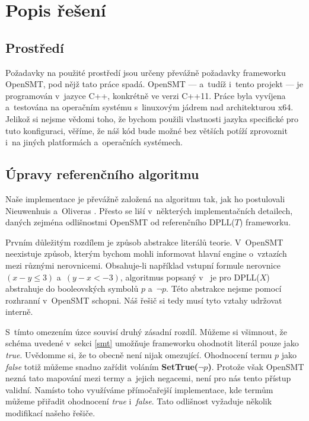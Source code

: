 \chapter{Popis řešení}


\section{Prostředí}

Požadavky na použité prostředí jsou určeny převážně požadavky frameworku OpenSMT, pod nějž tato práce spadá. OpenSMT --- a~tudíž i~tento projekt --- je programován v~jazyce C++, konkrétně ve verzi C++11. Práce byla vyvíjena a~testována na operačním systému s~linuxovým jádrem nad architekturou x64. Jelikož si nejsme vědomi toho, že bychom použili vlastnosti jazyka specifické pro tuto konfiguraci, věříme, že náš kód bude možné bez větších potíží zprovoznit i~na jiných platformách a~operačních systémech.

\section{Úpravy referenčního algoritmu}\label{upravy}

Naše implementace je převážně založená na algoritmu tak, jak ho postulovali Nieuwenhuis a~Oliveras \cite{Nieuwenhuis05}. Přesto se liší v~některých implementačních detailech, daných zejména odlišnostmi OpenSMT od referenčního DPLL($T$) frameworku. %

Prvním důležitým rozdílem je způsob abstrakce literálů teorie. V~OpenSMT neexistuje způsob, kterým bychom mohli informovat hlavní engine o~vztazích mezi různými nerovnicemi. Obsahuje-li například vstupní formule nerovnice $(x-y\leq 3)$ a~$(y-x<-3)$, algoritmus popsaný v~\cite{Nieuwenhuis05} je pro DPLL($X$) abstrahuje do booleovských symbolů $p$ a~$\neg p$. Této abstrakce nejsme pomocí rozhranní v~OpenSMT schopni. Náš řešič si tedy musí tyto vztahy udržovat interně. 

S~tímto omezením úzce souvisí druhý zásadní rozdíl. Můžeme si všimnout, že schéma uvedené v~sekci \ref{smt} umožňuje frameworku ohodnotit literál pouze jako \emph{true}. Uvědomme si, že to obecně není nijak omezující. Ohodnocení termu $p$ jako \emph{false} totiž můžeme snadno zařídit voláním \textbf{SetTrue($\neg p$)}. Protože však OpenSMT nezná tato mapování mezi termy a~jejich negacemi, není pro nás tento přístup validní. Namísto toho využíváme přímočařejší implementace, kde termům můžeme přiřadit ohodnocení \emph{true} i~\emph{false}. Tato odlišnost vyžaduje několik modifikací našeho řešiče. 

